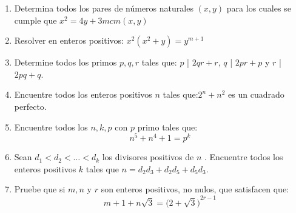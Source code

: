 \documentclass{book}
\begin{document}
\begin{enumerate}
        \item Determina todos los pares de números naturales $(x,y)$ para los cuales se cumple que $x^2=4y+3mcm(x,y)$
        \item Resolver en enteros positivos: $x^2(x^2+y)=y^{m+1}$
        \item Determine todos los primos $p,q,r$ tales que: $p$ | $2qr+r$, $q$ | $2pr+p$ y $r$ | $2pq+q$.
        \item Encuentre todos los enteros positivos $n$ tales que:$2^n+n^2$ es un cuadrado perfecto.
        \item Encuentre todos los $n,k,p$ con $p$ primo tales que:
        $$n^5+n^4+1=p^k$$
        \item Sean $d_1<d_2< \ldots  <d_k$  los divisores positivos de $n$ . Encuentre todos los enteros positivos $k$  tales que                        $n=d_2d_3+d_2d_5+d_5d_3$.
        \item Pruebe que si $m,n$  y $r$  son enteros positivos, no nulos, que satisfacen que:
        $$m+1+n\sqrt{3}={\big(2+\sqrt{3}\big)}^{2r-1}$$
    \end{enumerate}
    \newpage
\end{document}
